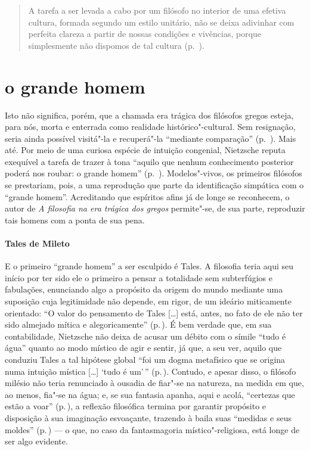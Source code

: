 \begin{quote} 
A tarefa a ser levada a cabo por um filósofo no interior de
 uma efetiva cultura, formada segundo um estilo unitário, não se deixa
 adivinhar com perfeita clareza a partir de nossas condições e vivências,
 porque simplesmente não dispomos de tal cultura (p.~\pageref{tarefaaserlevada}).
\end{quote} 

\section{o grande homem} 

Isto não significa, porém, que a chamada era trágica dos filósofos gregos 
esteja, para nós, morta e enterrada como realidade
 histórico"-cultural. Sem resignação, seria ainda possível visitá"-la e
 recuperá"-la ``mediante comparação'' (p.~\pageref{comparacao}). Mais até.
 Por meio de uma curiosa espécie de intuição congenial, Nietzsche reputa
 exequível a tarefa de trazer à tona ``aquilo que nenhum conhecimento
 posterior poderá nos roubar: o grande homem'' (p.~\pageref{ograndehomem}). 
 Modelos"-vivos, os primeiros filósofos se prestariam, pois,
 a uma reprodução que parte da identificação simpática com o ``grande
 homem''. Acreditando que espíritos afins já de longe se reconhecem, o autor
 de \textit{A filosofia na era trágica dos gregos} permite"-se, de sua parte,
 reproduzir tais homens com a ponta de sua pena.

\paragraph{Tales de Mileto} E o primeiro ``grande homem'' a ser esculpido é
 Tales. A filosofia teria aqui seu início por ter sido ele o primeiro a
 pensar a totalidade sem subterfúgios e fabulações, enunciando algo a
 propósito da origem do mundo mediante uma suposição cuja legitimidade não
 depende, em rigor, de um ideário miticamente orientado: ``O valor do
 pensamento de Tales [\ldots] está, antes, no fato de ele não ter sido
 almejado mítica e alegoricamente'' (p.\,\pageref{pensamentodetales}). É bem
 verdade que, em sua contabilidade, Nietzsche não deixa de acusar um débito
 com o símile ``tudo é água'' quanto ao modo místico de agir e sentir, já
 que, a seu ver, aquilo que conduziu Tales a tal hipótese global ``foi um
 dogma metafísico que se origina numa intuição mística [\ldots] `tudo é
 um'\,'' (p.\,\pageref{foiumdogma}). Contudo, e apesar disso, o filósofo
 milésio não teria renunciado à ousadia de fiar"-se na natureza, na medida em
 que, ao menos, fia"-se na água; e, se sua fantasia apanha, aqui e acolá,
 ``certezas que estão a voar'' (p.\,\pageref{certezasque}), a reflexão
 filosófica termina por garantir propósito e disposição à sua imaginação
 esvoaçante, trazendo à baila suas ``medidas e seus moldes'' 
 (p.\,\pageref{medidaseseusmoldes}) --- o que, no caso da fantasmagoria místico"-religiosa,
 está longe de ser algo evidente.

